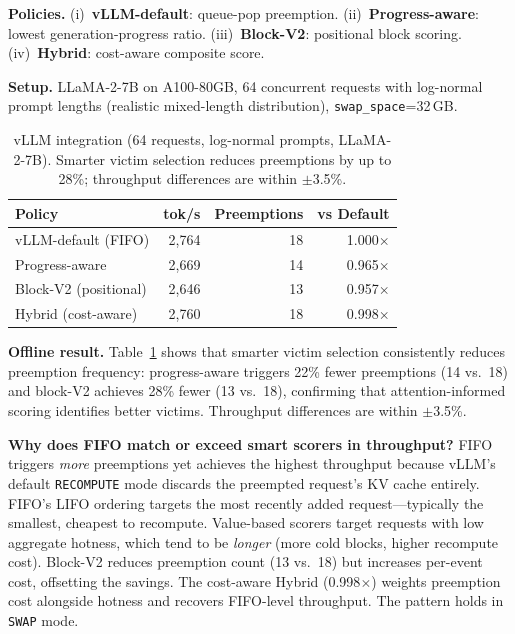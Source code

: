 \documentclass[conference]{IEEEtran}
\begin{document}
\textbf{Policies.} (i)~\textbf{vLLM-default}: queue-pop preemption. (ii)~\textbf{Progress-aware}: lowest generation-progress ratio. (iii)~\textbf{Block-V2}: positional block scoring. (iv)~\textbf{Hybrid}: cost-aware composite score.

\textbf{Setup.} LLaMA-2-7B on A100-80GB, 64 concurrent requests with log-normal prompt lengths (realistic mixed-length distribution), \texttt{swap\_space}=32\,GB.

\begin{table}[t]
\centering
\caption{vLLM integration (64 requests, log-normal prompts, LLaMA-2-7B). Smarter victim selection reduces preemptions by up to 28\%; throughput differences are within $\pm$3.5\%.}
\label{tab:vllm-realistic}
\small
\setlength{\tabcolsep}{8pt}
\begin{tabular}{@{}lrrr@{}}
\toprule
Policy & tok/s & Preemptions & vs Default \\
\midrule
vLLM-default (FIFO)    & 2{,}764 & 18 & 1.000$\times$ \\
Progress-aware          & 2{,}669 & 14 & 0.965$\times$ \\
Block-V2 (positional)   & 2{,}646 & 13 & 0.957$\times$ \\
Hybrid (cost-aware)     & 2{,}760 & 18 & 0.998$\times$ \\
\bottomrule
\end{tabular}
\end{table}

\textbf{Offline result.} Table~\ref{tab:vllm-realistic} shows that smarter victim selection consistently reduces preemption frequency: progress-aware triggers 22\% fewer preemptions (14 vs.\ 18) and block-V2 achieves 28\% fewer (13 vs.\ 18), confirming that attention-informed scoring identifies better victims. Throughput differences are within $\pm$3.5\%.

\textbf{Why does FIFO match or exceed smart scorers in throughput?} FIFO triggers \emph{more} preemptions yet achieves the highest throughput because vLLM's default \texttt{RECOMPUTE} mode discards the preempted request's KV cache entirely. FIFO's LIFO ordering targets the most recently added request---typically the smallest, cheapest to recompute. Value-based scorers target requests with low aggregate hotness, which tend to be \emph{longer} (more cold blocks, higher recompute cost). Block-V2 reduces preemption count (13 vs.\ 18) but increases per-event cost, offsetting the savings. The cost-aware Hybrid (0.998$\times$) weights preemption cost alongside hotness and recovers FIFO-level throughput. The pattern holds in \texttt{SWAP} mode.
\end{document}
